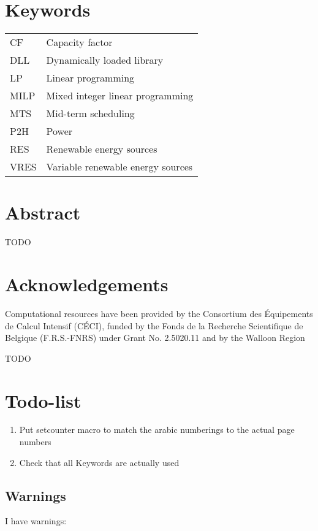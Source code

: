 \section*{Keywords}

\begin{table}[h!]
    \begin{tabular}{p{3cm} p{8cm}}
        CF & Capacity factor \\
        DLL & Dynamically loaded library \\
        LP & Linear programming \\
        MILP & Mixed integer linear programming \\
        MTS & Mid-term scheduling \\
        P2H & Power \\
        RES & Renewable energy sources \\
        VRES & Variable renewable energy sources \\
    \end{tabular}
\end{table}

\newpage

\section*{Abstract}

TODO


\section*{Acknowledgements}

Computational resources have been provided by the Consortium des Équipements de Calcul Intensif (CÉCI), funded by the Fonds de la Recherche Scientifique de Belgique (F.R.S.-FNRS) under Grant No. 2.5020.11 and by the Walloon Region

TODO

\section*{Todo-list}
\begin{enumerate}
    \item Put setcounter macro to match the arabic numberings to the actual page numbers
    \item Check that all Keywords are actually used
\end{enumerate}

\newpage

\tableofcontents

\subsection*{Warnings}

I have  warnings:
\begin{itemize}
    \mylistwarnings{\item}
\end{itemize}

\newpage